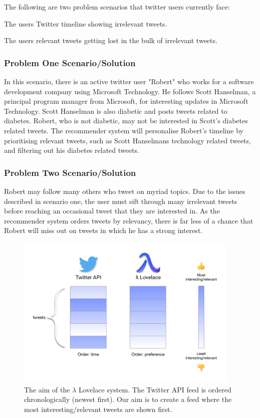 \documentclass{article}
\begin{document}
\begin{samepage}
\noindent The following are two problem scenarios that twitter users currently face:

\begin{itemize*}
	 \item The users Twitter timeline showing irrelevant tweets.
	 \item The users relevant tweets getting lost in the bulk of irrelevant tweets.
\end{itemize*}

\subsubsection*{Problem One Scenario/Solution} %
In this scenario, there is an active twitter user "Robert" who works for a software development company using Microsoft Technology. He follows Scott Hanselman, a principal program manager from Microsoft, for interesting updates in Microsoft Technology. Scott Hanselman is also diabetic and posts tweets related to diabetes. Robert, who is not diabetic, may not be interested in Scott's diabetes related tweets. The recommender system will personalise Robert's timeline by prioritising relevant tweets, such as Scott Hanselmans technology related tweets, and filtering out his diabetes related tweets. 

\subsubsection*{Problem Two Scenario/Solution} %
Robert may follow many others who tweet on myriad topics. Due to the issues described in scenario one, the user must sift through many irrelevant tweets before reaching an occasional tweet that they are interested in. As the recommender system orders tweets by relevancy, there is far less of a chance that Robert will miss out on tweets in which he has a strong interest.
\end{samepage}

\begin{figure}[H]
    \centering
    \includegraphics[width=0.95\textwidth]{explaining}
    \caption{The aim of the $\lambda$ Lovelace system. The Twitter API feed is ordered chronologically (newest first). Our aim is to create a feed where the most interesting/relevant tweets are shown first.}
\end{figure}
\end{document}

